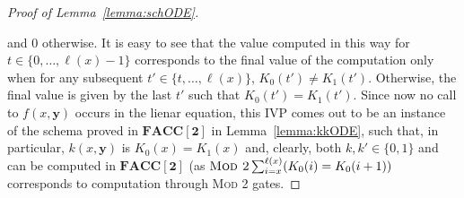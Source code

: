 \documentclass[11pt, oneside]{article}
\newcommand{\FACC}{\mathbf{FACC[2]}}
\newcommand{\tu}[1]{\mathbf{#1}}
\theoremstyle{definition}
\begin{document}
\begin{toappendix}
\begin{proof}[Proof of Lemma~\ref{lemma:schODE}]
\begin{itemize}
    \end{itemize}
and 0 otherwise.
It is easy to see that the value computed in this way for $t\in \{0,\dots, \ell(x)-1\}$ corresponds to the final value of the computation only when for any subsequent $t'\in \{t,\dots, \ell(x)\}$, $K_0(t')\neq K_1(t')$. Otherwise, the final value is given by the last $t'$ such that $K_0(t')=K_1(t')$. 
%
    Since now no call to $f(x, \tu y)$ occurs in the lienar equation, this IVP comes out to be an instance of the schema proved in $\FACC$ in Lemma~\ref{lemma:kkODE}, such that, in particular,  $k(x, \tu y)$ is $K_0(x)=K_1(x)$ and, clearly, both $k,k'\in \{0,1\}$ and can be computed in $\FACC$ (as $\textsc{Mod 2} \sum^{\ell(x)}_{i=x}(K_0(i) = K_0(i+1))$ corresponds to computation through \textsc{Mod 2} gates.


    
   


\end{proof}
\end{toappendix}
\end{document}
